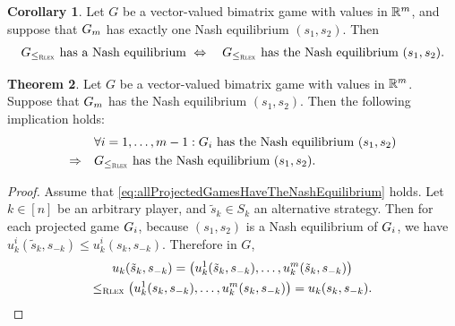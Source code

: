 \documentclass[a4paper]{scrreprt}
\theoremstyle{definition}
\newtheorem{thm}{Theorem}[chapter] %
\newtheorem{cor}[thm]{Corollary}
\begin{document}
    \begin{cor}
        Let $G$ be a vector-valued bimatrix game with values in $\mathbb{R}^m$, and suppose that  $G_{m}$ has exactly one Nash equilibrium $(s_1, s_2)$.
        Then
        \begin{gather*}
            G_{\leq_{\textsc{Rlex}}} \text{ has a Nash equilibrium } 
            \Leftrightarrow\quad G_{\leq_{\textsc{Rlex}}} \text{ has the Nash equilibrium } (s_1, s_2).   
        \end{gather*}
    \end{cor}

    \begin{thm}
        \label{thm:rlexGameProjectedGameSufficientCondition}
        Let $G$ be a vector-valued bimatrix game with values in $\mathbb{R}^m$.
        Suppose that $G_{m}$ has the 
        Nash equilibrium $(s_1, s_2)$.    
        Then the following implication holds:
        \begin{align}
            \label{eq:allProjectedGamesHaveTheNashEquilibrium}
                            &\forall i = 1, \dots, m-1: G_{i} \text{ has the Nash equilibrium } (s_1, s_2) \\
            \Rightarrow\quad &G_{\leq_{\textsc{Rlex}}} \text{ has the Nash equilibrium } (s_1, s_2).
        \end{align}
    \end{thm}
    \begin{proof}
        Assume that \eqref{eq:allProjectedGamesHaveTheNashEquilibrium} holds.
        Let $k \in [n]$ be an arbitrary player, and $\tilde{s}_k \in S_k$ an alternative strategy.
        Then for each projected game $G_{i}$, because $(s_1, s_2)$ is a Nash equilibrium of $G_{i}$, we have $u_k^{i}(\tilde{s}_k, s_{-k}) \leq u_k^{i}(s_k, s_{-k})$.
        Therefore in $G$,
        \begin{multline*}
            u_k(\tilde{s}_k, s_{-k}) 
            = \bigl(u_k^{1}(\tilde{s}_k, s_{-k}), \dots, u_k^{m}(\tilde{s}_k, s_{-k})\bigr) \\
            \leq_{\textsc{Rlex}} \bigl(u_k^{1}(s_k, s_{-k}), \dots, u_k^{m}(s_k, s_{-k})\bigr)
            = u_k(s_k, s_{-k}).
        \end{multline*}
    \end{proof}
\end{document}
